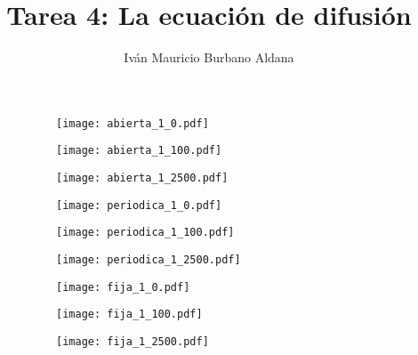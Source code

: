 \documentclass[a4paper]{article}
\title{Tarea 4: La ecuaci\'on de difusi\'on}
\author{Iv\'an Mauricio Burbano Aldana}
\begin{document}
	\maketitle

	\begin{figure}
		\centering
		\begin{subfigure}{\textwidth}
			\centering
			\texttt{[image: abierta\_1\_0.pdf]}
			\caption{\label{fig:abierta_1_0}}
		\end{subfigure}
		\begin{subfigure}{\textwidth}
			\centering
			\texttt{[image: abierta\_1\_100.pdf]}
			\caption{\label{fig:abierta_1_100}}
		\end{subfigure}
		\begin{subfigure}{\textwidth}
			\centering
			\texttt{[image: abierta\_1\_2500.pdf]}
			\caption{\label{fig:abierta_1_2500}}
		\end{subfigure}
	\end{figure}
	\begin{figure}\ContinuedFloat
		\centering
		\begin{subfigure}{\textwidth}
			\centering
			\texttt{[image: periodica\_1\_0.pdf]}
			\caption{\label{fig:periodica_1_0}}
		\end{subfigure}
		\begin{subfigure}{\textwidth}
			\centering
			\texttt{[image: periodica\_1\_100.pdf]}
			\caption{\label{fig:periodica_1_100}}
		\end{subfigure}
		\begin{subfigure}{\textwidth}
			\centering
			\texttt{[image: periodica\_1\_2500.pdf]}
			\caption{\label{fig:periodica_1_2500}}
		\end{subfigure}
	\end{figure}
	\begin{figure}\ContinuedFloat
		\centering
		\begin{subfigure}{\textwidth}
			\centering
			\texttt{[image: fija\_1\_0.pdf]}
			\caption{\label{fig:fija_1_0}}
		\end{subfigure}
		\begin{subfigure}{\textwidth}
			\centering
			\texttt{[image: fija\_1\_100.pdf]}
			\caption{\label{fig:fija_1_100}}
		\end{subfigure}
		\begin{subfigure}{\textwidth}
			\centering
			\texttt{[image: fija\_1\_2500.pdf]}
			\caption{\label{fig:fija_1_2500}}
		\end{subfigure}
	\end{figure}
\end{document}
